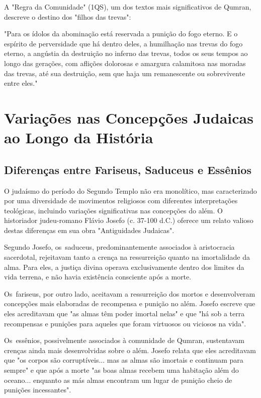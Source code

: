 A "Regra da Comunidade" (1QS), um dos textos mais significativos de Qumran, descreve o destino dos "filhos das trevas":

"Para os ídolos da abominação está reservada a punição do fogo eterno. E o espírito de perversidade que há dentro deles, a humilhação nas trevas do fogo eterno, a angústia da destruição no inferno das trevas, todos os seus tempos ao longo das gerações, com aflições dolorosas e amargura calamitosa nas moradas das trevas, até sua destruição, sem que haja um remanescente ou sobrevivente entre eles."

\section{Variações nas Concepções Judaicas ao Longo da História}

\subsection{Diferenças entre Fariseus, Saduceus e Essênios}

O judaísmo do período do Segundo Templo não era monolítico, mas caracterizado por uma diversidade de movimentos religiosos com diferentes interpretações teológicas, incluindo variações significativas nas concepções do além. O historiador judeu-romano Flávio Josefo (c. 37-100 d.C.) oferece um relato valioso destas diferenças em sua obra "Antiguidades Judaicas".

Segundo Josefo, os saduceus, predominantemente associados à aristocracia sacerdotal, rejeitavam tanto a crença na ressurreição quanto na imortalidade da alma. Para eles, a justiça divina operava exclusivamente dentro dos limites da vida terrena, e não havia existência consciente após a morte.

Os fariseus, por outro lado, aceitavam a ressurreição dos mortos e desenvolveram concepções mais elaboradas de recompensa e punição no além. Josefo escreve que eles acreditavam que "as almas têm poder imortal nelas" e que "há sob a terra recompensas e punições para aqueles que foram virtuosos ou viciosos na vida".

Os essênios, possivelmente associados à comunidade de Qumran, sustentavam crenças ainda mais desenvolvidas sobre o além. Josefo relata que eles acreditavam que "os corpos são corruptíveis... mas as almas são imortais e continuam para sempre" e que após a morte "as boas almas recebem uma habitação além do oceano... enquanto as más almas encontram um lugar de punição cheio de punições incessantes".

